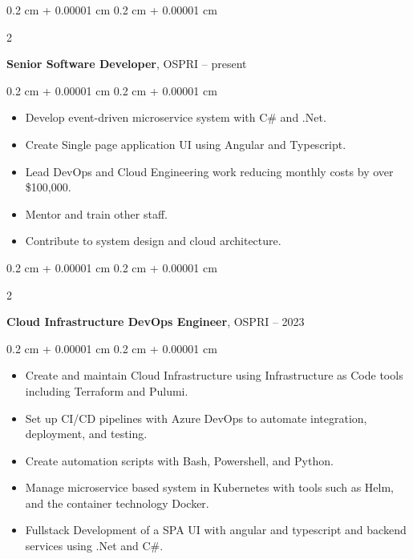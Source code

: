 \documentclass[10pt, letterpaper]{article}
\newenvironment{highlights}{
    \begin{itemize}[
        topsep=0.10 cm,
        parsep=0.10 cm,
        partopsep=0pt,
        itemsep=0pt,
        leftmargin=0.4 cm + 10pt
    ]
}{
    \end{itemize}
} %
\newenvironment{onecolentry}{
    \begin{adjustwidth}{
        0.2 cm + 0.00001 cm
    }{
        0.2 cm + 0.00001 cm
    }
}{
    \end{adjustwidth}
} %
\newenvironment{twocolentry}[2][]{
    \onecolentry
    \def\secondColumn{#2}
    \setcolumnwidth{\fill, 4.5 cm}
    \begin{paracol}{2}
}{
    \switchcolumn \raggedleft \secondColumn
    \end{paracol}
    \endonecolentry
} %
\begin{document}
        
        \begin{twocolentry}{
            2023 – present
        }
            \textbf{Senior Software Developer}, OSPRI\end{twocolentry}

        \vspace{0.10 cm}
        \begin{onecolentry}
            \begin{highlights}
                \item Develop event-driven microservice system with C\# and .Net.
                \item Create Single page application UI using Angular and Typescript.
                \item Lead DevOps and Cloud Engineering work reducing monthly costs by over \$100,000.
                \item Mentor and train other staff.
                \item Contribute to system design and cloud architecture.
            \end{highlights}
        \end{onecolentry}


        \vspace{0.2 cm}

        \begin{twocolentry}{
            2021 – 2023
        }
            \textbf{Cloud Infrastructure DevOps Engineer}, OSPRI\end{twocolentry}

        \vspace{0.10 cm}
        \begin{onecolentry}
            \begin{highlights}
                \item Create and maintain Cloud Infrastructure using Infrastructure as Code tools including Terraform and Pulumi.
                \item Set up CI/CD pipelines with Azure DevOps to automate integration, deployment, and testing.
                \item Create automation scripts with Bash, Powershell, and Python.
                \item Manage microservice based system in Kubernetes with tools such as Helm, and the container technology Docker.
                \item Fullstack Development of a SPA UI with angular and typescript and backend services using .Net and C\#.
            \end{highlights}
        \end{onecolentry}
\end{document}
